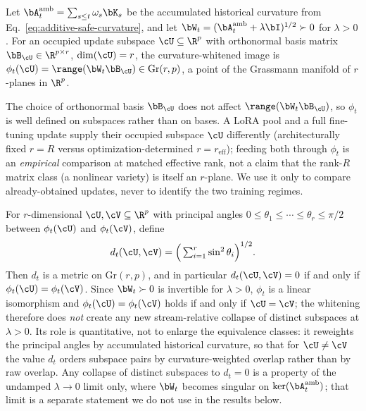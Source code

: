 \begin{definition}
\label{def:whitening-embedding}
Let $\bA_t^{\mathrm{amb}}=\sum_{s\le t}\omega_s\bK_s$ be the accumulated
historical curvature from Eq.~\eqref{eq:additive-safe-curvature}, and let
$\bW_t=(\bA_t^{\mathrm{amb}}+\lambda\bI)^{1/2}\succ0$ for $\lambda>0$. For an
occupied update subspace $\cU\subseteq\R^p$ with orthonormal basis matrix
$\bB_\cU\in\R^{p\times r}$, $\dim(\cU)=r$, the curvature-whitened image is
$\phi_t(\cU)=\range(\bW_t\bB_\cU)\in\mathrm{Gr}(r,p)$, a point of the Grassmann
manifold of $r$-planes in $\R^p$.
\end{definition}

The choice of orthonormal basis $\bB_\cU$ does not affect
$\range(\bW_t\bB_\cU)$, so $\phi_t$ is well defined on subspaces rather than on
bases. A LoRA pool and a full fine-tuning update supply their occupied subspace
$\cU$ differently (architecturally fixed $r=R$ versus optimization-determined
$r=r_{\mathrm{eff}}$); feeding both through $\phi_t$ is an \emph{empirical}
comparison at matched effective rank, not a claim that the rank-$R$ matrix class
(a nonlinear variety) is itself an $r$-plane. We use it only to compare
already-obtained updates, never to identify the two training regimes.

\begin{proposition}
\label{prop:expressivity-metric}
For $r$-dimensional $\cU,\cV\subseteq\R^p$ with principal angles
$0\le\theta_1\le\cdots\le\theta_r\le\pi/2$ between $\phi_t(\cU)$ and
$\phi_t(\cV)$, define
\begin{equation}
  d_t(\cU,\cV)=\Big(\textstyle\sum_{i=1}^{r}\sin^2\theta_i\Big)^{1/2}.
  \label{eq:app-expressivity-distance}
\end{equation}
Then $d_t$ is a metric on $\mathrm{Gr}(r,p)$, and in particular
$d_t(\cU,\cV)=0$ if and only if $\phi_t(\cU)=\phi_t(\cV)$. Since $\bW_t\succ0$ is
invertible for $\lambda>0$, $\phi_t$ is a linear isomorphism and
$\phi_t(\cU)=\phi_t(\cV)$ holds if and only if $\cU=\cV$; the whitening
therefore does \emph{not} create any new stream-relative collapse of distinct
subspaces at $\lambda>0$. Its role is quantitative, not to enlarge the
equivalence classes: it reweights the principal angles by accumulated historical
curvature, so that for $\cU\neq\cV$ the value $d_t$ orders subspace pairs by
curvature-weighted overlap rather than by raw overlap. Any collapse of distinct
subspaces to $d_t=0$ is a property of the undamped $\lambda\to0$ limit only,
where $\bW_t$ becomes singular on $\ker(\bA_t^{\mathrm{amb}})$; that limit is a
separate statement we do not use in the results below.
\end{proposition}

